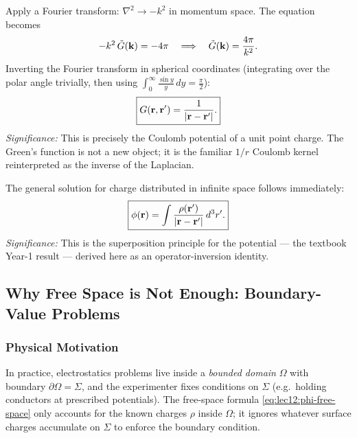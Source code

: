Apply a Fourier transform: $\nabla^2 \to -k^2$ in momentum space.  The equation becomes
\begin{equation}\label{eq:lec12:fourier-G}
  -k^2\,\tilde{G}(\mathbf{k}) = -4\pi
  \quad\Longrightarrow\quad
  \tilde{G}(\mathbf{k}) = \frac{4\pi}{k^2} .
\end{equation}
Inverting the Fourier transform in spherical coordinates (integrating over the polar angle
trivially, then using $\int_0^\infty \frac{\sin y}{y}\,dy = \frac{\pi}{2}$):
\begin{equation}\label{eq:lec12:G-result}
  \boxed{
    G(\mathbf{r},\mathbf{r}') = \frac{1}{|\mathbf{r} - \mathbf{r}'|} .
  }
\end{equation}
\textit{Significance:} This is precisely the Coulomb potential of a unit point charge.
The Green's function is not a new object; it is the familiar $1/r$ Coulomb kernel
reinterpreted as the inverse of the Laplacian.

The general solution for charge distributed in infinite space follows immediately:
\begin{equation}\label{eq:lec12:phi-free-space}
  \boxed{
    \phi(\mathbf{r}) = \int \frac{\rho(\mathbf{r}')}{|\mathbf{r}-\mathbf{r}'|}\,d^3r' .
  }
\end{equation}
\textit{Significance:} This is the superposition principle for the potential —
the textbook Year-1 result — derived here as an operator-inversion identity.

\subsection{Why Free Space is Not Enough: Boundary-Value Problems}\label{subsec:lec12-bvp}

\subsubsection*{Physical Motivation}
In practice, electrostatics problems live inside a \emph{bounded domain} $\Omega$ with
boundary $\partial\Omega = \Sigma$, and the experimenter fixes conditions on $\Sigma$
(e.g.\ holding conductors at prescribed potentials).  The free-space formula
\eqref{eq:lec12:phi-free-space} only accounts for the known charges $\rho$ inside $\Omega$;
it ignores whatever surface charges accumulate on $\Sigma$ to enforce the boundary condition.

